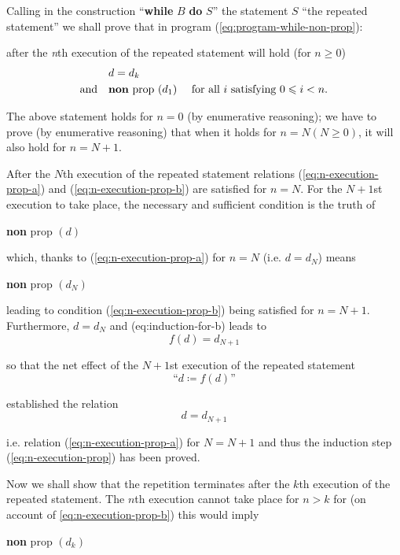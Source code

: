Calling in the construction ``\textbf{while} $B$ \textbf{do} $S$'' the statement $S$ ``the repeated statement'' we shall prove that in program (\ref{eq:program-while-non-prop}):

\quad after the \textit{n}th execution of the repeated statement will hold (for $n \geqslant 0$)
\begin{subequations}
	\label{eq:n-execution-prop}
	\begin{align}
		\label{eq:n-execution-prop-a}
		&d=d_k& \\
		\label{eq:n-execution-prop-b}
		\text{and}\quad &\text{\textbf{non} prop }(d_1) &\text{ for all } i \text{ satisfying } 0 \leqslant i < n.
	\end{align}
\end{subequations}

The above statement holds for $n = 0$ (by enumerative reasoning); we have to prove (by enumerative reasoning) that when it holds for $n = N(N \geqslant 0)$, it will also hold for $n = N + 1$.

After the $N$th execution of the repeated statement relations (\ref{eq:n-execution-prop-a}) and (\ref{eq:n-execution-prop-b}) are satisfied for $n = N$. For the $N + 1$st execution to take place, the necessary and sufficient condition is the truth of
\begin{center}
	\textbf{non} prop $(d)$
\end{center}

\noindent
which, thanks to (\ref{eq:n-execution-prop-a}) for $n = N$ (i.e. $d = d_N$) means
\begin{center}
	\textbf{non} prop $(d_N)$
\end{center}

\noindent 
leading to condition (\ref{eq:n-execution-prop-b}) being satisfied for $n = N + 1$. Furthermore, $d = d_N$ and (eq:induction-for-b) leads to
$$
f(d) = d_{N + 1}
$$

\noindent
so that the net effect of the $N + 1$st execution of the repeated statement
$$
\text{``}d \coloneq f(d)\text{''}
$$

\noindent
established the relation
$$
d = d_{N + 1}
$$

\noindent
i.e. relation (\ref{eq:n-execution-prop-a}) for $N = N + 1$ and thus the induction step (\ref{eq:n-execution-prop}) has been
proved.

Now we shall show that the repetition terminates after the $k$th execution of the repeated statement. The $n$th execution cannot take place for $n > k$
for (on account of \ref{eq:n-execution-prop-b}) this would imply
\begin{center}
	\textbf{non} prop $(d_k)$
\end{center}

